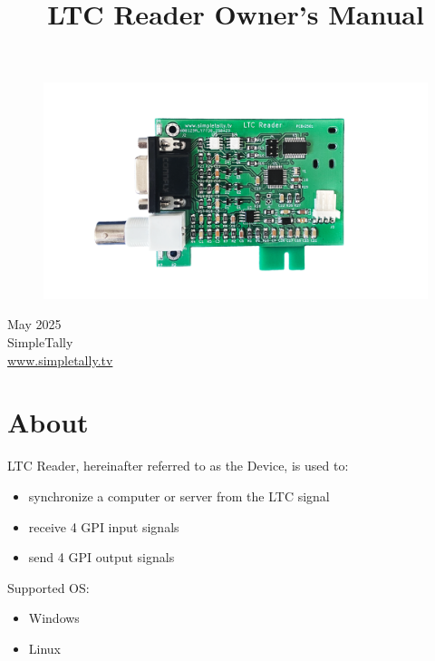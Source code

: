 \documentclass{article}
\title{\textbf{LTC Reader Owner's Manual}}
\date{} %
\author{}
\begin{document}
	\begin{titlepage} %
		\centering
		\maketitle
		\thispagestyle{empty} %
		\vspace{1cm} %
		\begin{figure}[h]
			\centering
			\includegraphics[width=\textwidth, keepaspectratio]{imgs/schema.png}
		\end{figure}
		\vfill %
		\Large
		May 2025 \\
		SimpleTally \\
		\href{http://www.simpletally.tv}{www.simpletally.tv}
	\end{titlepage}
	\setcounter{page}{2}   %
	\tableofcontents %
	\newpage %
	
	\section{About}\label{about}
		\noindent LTC Reader, hereinafter referred to as the Device, is used to:
		\begin{itemize}
			\item
			 synchronize a computer or server from the LTC signal
			\item
			receive 4 GPI input signals
			\item
			send 4 GPI output signals
		\end{itemize}
		\noindent Supported OS:
		\begin{itemize}
			\item
			Windows
			\item
			Linux
		\end{itemize}
	
\end{document}
